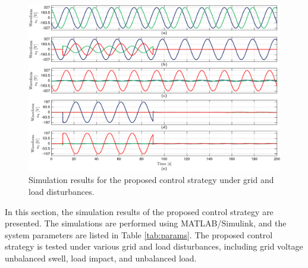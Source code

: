 \begin{figure}
    \centering
    \includegraphics[width=\textwidth]{Images/Fig3_ex.pdf}
    \caption{Simulation results for the proposed control strategy under grid and load disturbances.}
    \label{fig:sim3}
\end{figure}

In this section, the simulation results of the proposed control strategy are presented. The simulations are performed using MATLAB/Simulink, and the system parameters are listed in Table \ref{tab:params}. The proposed control strategy is tested under various grid and load disturbances, including grid voltage unbalanced swell, load impact, and unbalanced load.

